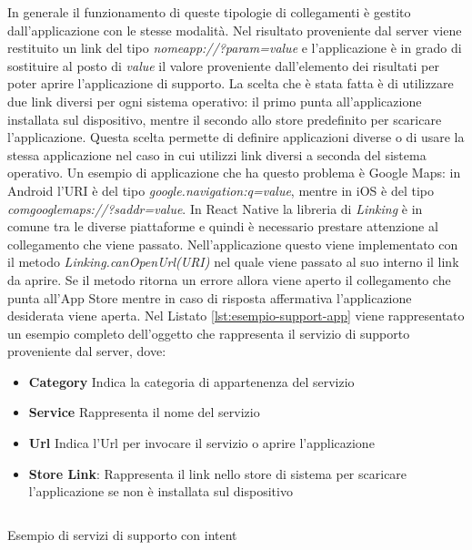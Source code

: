 In generale il funzionamento di queste tipologie di collegamenti è gestito dall'ap\-pli\-ca\-zio\-ne con le stesse modalità. Nel risultato proveniente dal server viene restituito un link del tipo \emph{nomeapp://?param={value}} e l'applicazione è in grado di sostituire al posto di \emph{value} il valore proveniente dall'elemento dei risultati per poter aprire l'applicazione di supporto. La scelta che è stata fatta è di utilizzare due link diversi per ogni sistema operativo: il primo punta all'applicazione installata sul dispositivo, mentre il secondo allo store predefinito per scaricare l'applicazione. Questa scelta permette di definire applicazioni diverse o di usare la stessa applicazione nel caso in cui utilizzi link diversi a seconda del sistema operativo. Un esempio di applicazione che ha questo problema è Google Maps: in Android l'URI è del tipo \emph{google.navigation:q={value}}, mentre in iOS è del tipo \emph{comgooglemaps://?saddr={value}}. In React Native la libreria di \emph{Linking} è in comune tra le diverse piattaforme e quindi è necessario prestare attenzione al collegamento che viene passato. Nell'applicazione questo viene implementato con il metodo \emph{Linking.canOpenUrl(URI)} nel quale viene passato al suo interno il link da aprire. Se il metodo ritorna un errore allora viene aperto il collegamento che punta all'App Store mentre in caso di risposta affermativa l'applicazione desiderata viene aperta. Nel Listato \ref{lst:esempio-support-app} viene rappresentato un esempio completo dell'oggetto che rappresenta il servizio di supporto proveniente dal server, dove:
\begin{itemize}
	\item \textbf{Category} Indica la categoria di appartenenza del servizio
	\item \textbf{Service} Rappresenta il nome del servizio
	\item \textbf{Url} Indica l'Url per invocare il servizio o aprire l'applicazione
	\item \textbf{Store Link}: Rappresenta il link nello store di sistema per scaricare l'ap\-pli\-ca\-zio\-ne se non è installata sul dispositivo  

\end{itemize}

\begin{listing}[H]
	\inputminted{json}{6-implementazione-app/Codice/esempio_supporto_app.json}
	\caption{Esempio di servizi di supporto con intent}
	\label{lst:esempio-support-app}
\end{listing}